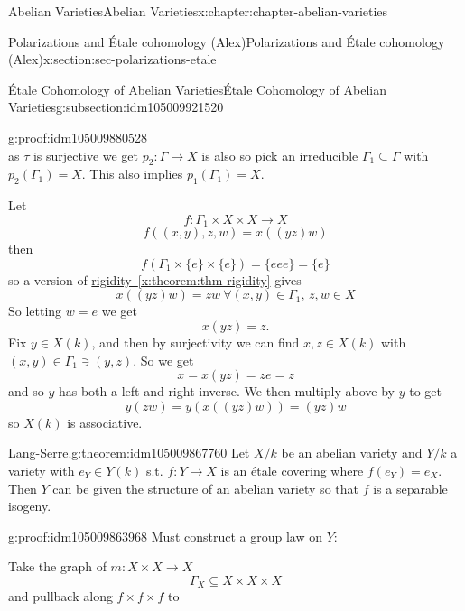 \documentclass[oneside,10pt,]{book}
\numberwithin{equation}{section}
\begin{document}
\begin{chapterptx}{Abelian Varieties}{}{Abelian Varieties}{}{}{x:chapter:chapter-abelian-varieties}
\begin{sectionptx}{Polarizations and Étale cohomology (Alex)}{}{Polarizations and Étale cohomology (Alex)}{}{}{x:section:sec-polarizations-etale}
\begin{subsectionptx}{Étale Cohomology of Abelian Varieties}{}{Étale Cohomology of Abelian Varieties}{}{}{g:subsection:idm105009921520}
\begin{proofptx}{}{g:proof:idm105009880528}
\begin{equation*}
\end{equation*}
as \(\tau \) is surjective we get \(p_2 \colon \Gamma \to X\) is also so pick an irreducible \(\Gamma_1 \subseteq \Gamma\) with \(p_2(\Gamma_1) = X\). This also implies \(p_1(\Gamma_1) = X\).%
\par
Let%
\begin{equation*}
f\colon \Gamma_1 \times X\times X \to X
\end{equation*}
%
\begin{equation*}
f((x,y),z,w) = x((yz)w)
\end{equation*}
then%
\begin{equation*}
f(\Gamma_1 \times\{e\}\times\{e\}) = \{eee\} = \{e\}
\end{equation*}
so a version of \hyperref[x:theorem:thm-rigidity]{rigidity~\ref{x:theorem:thm-rigidity}} gives%
\begin{equation*}
x((yz)w) = zw\ \forall (x,y) \in \Gamma_1,\,z,w\in X
\end{equation*}
So letting \(w = e\) we get%
\begin{equation*}
x(yz) = z\text{.}
\end{equation*}
Fix \(y \in X(k)\), and then by surjectivity we can find \(x,z \in X(k)\) with \((x,y)\in \Gamma_1 \ni (y,z)\). So we get%
\begin{equation*}
x = x(yz) = ze = z
\end{equation*}
and so \(y\) has both a left and right inverse. We then multiply above by \(y\) to get%
\begin{equation*}
y(zw) = y(x((yz)w)) = (yz)w
\end{equation*}
so \(X(k)\) is associative.%
\end{proofptx}
\begin{theorem}{Lang-Serre.}{}{g:theorem:idm105009867760}%
Let \(X/k\) be an abelian variety and \(Y/k\) a variety with \(e_Y\in Y(k)\) s.t. \(f\colon Y \to X\) is an étale covering where \(f(e_Y) = e_X\). Then \(Y\) can be given the structure of an abelian variety so that \(f\) is a separable isogeny.%
\end{theorem}
\begin{proofptx}{}{g:proof:idm105009863968}
Must construct a group law on \(Y\):%
\par
Take the graph of \(m\colon X\times X \to X\)%
\begin{equation*}
\Gamma_X \subseteq X\times X\times X
\end{equation*}
and pullback along \(f\times f\times f\) to%
\begin{equation*}

\end{equation*}
\end{proofptx}
\end{subsectionptx}
\end{sectionptx}
\end{chapterptx}
\end{document}

